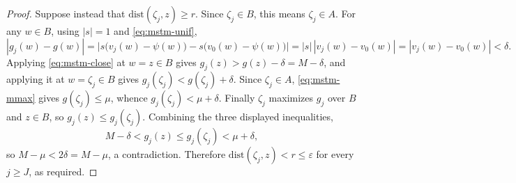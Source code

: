 \begin{proof}
Suppose instead that $\mathrm{dist}(\zeta_j,z)\ge r$. Since $\zeta_j\in B$, this
means $\zeta_j\in A$. For any $w\in B$, using $|s|=1$ and
\eqref{eq:mstm-unif},
\begin{equation}\label{eq:mstm-close}
  |g_j(w)-g(w)|
   =\bigl|s\bigl(v_j(w)-\psi(w)\bigr)-s\bigl(v_0(w)-\psi(w)\bigr)\bigr|
   =|s|\,|v_j(w)-v_0(w)|
   =|v_j(w)-v_0(w)|<\delta .
\end{equation}
Applying \eqref{eq:mstm-close} at $w=z\in B$ gives $g_j(z)>g(z)-\delta=M-\delta$,
and applying it at $w=\zeta_j\in B$ gives $g_j(\zeta_j)<g(\zeta_j)+\delta$. Since
$\zeta_j\in A$, \eqref{eq:mstm-mmax} gives $g(\zeta_j)\le\mu$, whence
$g_j(\zeta_j)<\mu+\delta$. Finally $\zeta_j$ maximizes $g_j$ over $B$ and
$z\in B$, so $g_j(z)\le g_j(\zeta_j)$. Combining the three displayed
inequalities,
\[
  M-\delta<g_j(z)\le g_j(\zeta_j)<\mu+\delta ,
\]
so $M-\mu<2\delta=M-\mu$, a contradiction. Therefore
$\mathrm{dist}(\zeta_j,z)<r\le\varepsilon$ for every $j\ge J$, as required.
\end{proof}
